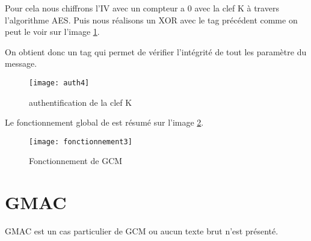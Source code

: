 Pour cela nous chiffrons l'IV avec un compteur a 0 avec la clef K à travers l'algorithme AES. Puis nous réalisons un XOR avec le tag précédent comme on peut le voir sur l'image \ref{auth4}.

On obtient donc un tag qui permet de vérifier l'intégrité de tout les paramètre du message.

\begin{figure}[!h]
  \centering
  \texttt{[image: auth4]}
  \caption{authentification de la clef K}
  \label{auth4}
\end{figure}


Le fonctionnement global de \aes est résumé sur l'image \ref{Fonctionnement de GCM}.


\begin{figure}[!h]
  \centering
  \texttt{[image: fonctionnement3]}
  \caption{Fonctionnement de GCM}
  \label{Fonctionnement de GCM}
\end{figure}


\section{GMAC}

GMAC est un cas particulier de GCM ou aucun texte brut n'est présenté.

